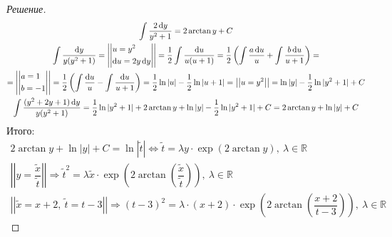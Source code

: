 \documentclass[a4paper,12pt]{article}
\newcommand{\R}{\mathbb{R}}
\renewcommand*\d{\mathop{}\!\mathrm{d}}
\newcommand{\wx}{\widetilde{x}}
\newcommand{\wt}{\widetilde{t}}
\newcommand{\ds}{\displaystyle}
\begin{document}
\begin{proof}[Решение]
\begin{gather*}
		\ds\int\dfrac{2\d y}{y^2 + 1} = 2\arctan y + C\\
		\ds\int\dfrac{\d y}{y(y^2 + 1)} = \left|\left|\begin{gathered}
			u = y^2\hfill\\
			\d u = 2y\d y\hfill
		\end{gathered}\right|\right| = \dfrac{1}{2}\ds\int\dfrac{\d u}{u(u + 1)} = \dfrac{1}{2}\left(\ds\int \dfrac{a\d u}{u} + \ds\int \dfrac{b\d u}{u + 1}\right) = \\
		= \left|\left|\begin{gathered}
			a = 1\hfill\\
			b = -1\hfill
		\end{gathered}\right|\right| = \dfrac{1}{2}\left(\ds\int\dfrac{\d u}{u} - \ds\int\dfrac{\d u}{u + 1}\right) = \dfrac{1}{2}\ln|u| - \dfrac{1}{2}\ln|u + 1| = \left|\left|u = y^2\right|\right| = \ln|y| - \dfrac{1}{2}\ln|y^2 + 1| + C\\
		\ds\int\dfrac{(y^2 + 2y + 1)\d y}{y(y^2 + 1)} = \dfrac{1}{2}\ln|y^2 + 1| + 2\arctan y + \ln|y| - \dfrac{1}{2}\ln|y^2 + 1| + C = 2\arctan y + \ln|y| + C
	\end{gather*}
	Итого:
	\begin{gather*}
		2\arctan y + \ln|y| + C = \ln|\wt| \iff \wt = \lambda y\cdot \exp(2\arctan y),\ \lambda \in \R\\
		\left|\left|y = \dfrac{\wx}{\wt}\right|\right| \Longrightarrow \wt^2 = \lambda\wx\cdot\exp(2\arctan(\dfrac{\wx}{\wt})),\ \lambda \in \R\\
		\left|\left|\wx = x + 2,\ \wt = t - 3\right|\right| \Longrightarrow (t - 3)^2 = \lambda\cdot(x+2)\cdot \exp(2\arctan(\dfrac{x + 2}{t - 3})),\ \lambda \in \R
	\end{gather*}
\end{proof}
\end{document}
